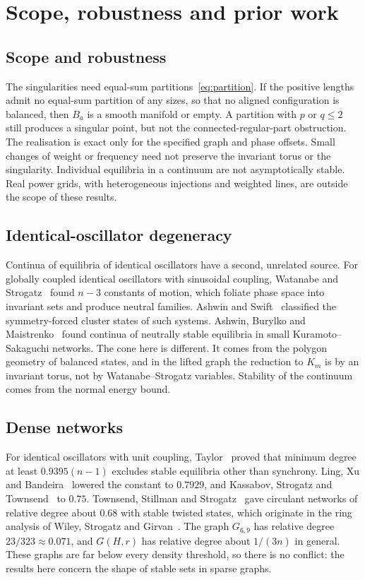 \documentclass[11pt,a4paper]{article}
\theoremstyle{definition}\newtheorem{conjecture}{Conjecture}
\theoremstyle{remark}\newtheorem{remark}[theorem]{Remark}
\begin{document}
\section{Scope, robustness and prior work}\label{sec:prior}

\subsection{Scope and robustness}\label{sec:scope}
The singularities need equal-sum partitions~\eqref{eq:partition}. If the positive lengths admit no equal-sum partition of any sizes, so that no aligned configuration is balanced, then $B_a$ is a smooth manifold or empty. A partition with $p$ or $q\le2$ still produces a singular point, but not the connected-regular-part obstruction. The realisation is exact only for the specified graph and phase offsets. Small changes of weight or frequency need not preserve the invariant torus or the singularity. Individual equilibria in a continuum are not asymptotically stable. Real power grids, with heterogeneous injections and weighted lines, are outside the scope of these results.

\subsection{Identical-oscillator degeneracy}
Continua of equilibria of identical oscillators have a second, unrelated source. For globally coupled identical oscillators with sinusoidal coupling, Watanabe and Strogatz~\cite{ws} found $n-3$ constants of motion, which foliate phase space into invariant sets and produce neutral families. Ashwin and Swift~\cite{ashwinswift} classified the symmetry-forced cluster states of such systems. Ashwin, Burylko and Maistrenko~\cite{abm} found continua of neutrally stable equilibria in small Kuramoto--Sakaguchi networks. The cone here is different. It comes from the polygon geometry of balanced states, and in the lifted graph the reduction to $K_m$ is by an invariant torus, not by Watanabe--Strogatz variables. Stability of the continuum comes from the normal energy bound.

\subsection{Dense networks}
For identical oscillators with unit coupling, Taylor~\cite{taylor} proved that minimum degree at least $0.9395(n-1)$ excludes stable equilibria other than synchrony. Ling, Xu and Bandeira~\cite{lxb} lowered the constant to $0.7929$, and Kassabov, Strogatz and Townsend~\cite{kst} to $0.75$. Townsend, Stillman and Strogatz~\cite{tss} gave circulant networks of relative degree about $0.68$ with stable twisted states, which originate in the ring analysis of Wiley, Strogatz and Girvan~\cite{wsg}. The graph $G_{6,9}$ has relative degree $23/323\approx0.071$, and $G(H,r)$ has relative degree about $1/(3n)$ in general. These graphs are far below every density threshold, so there is no conflict: the results here concern the shape of stable sets in sparse graphs.
\end{document}
